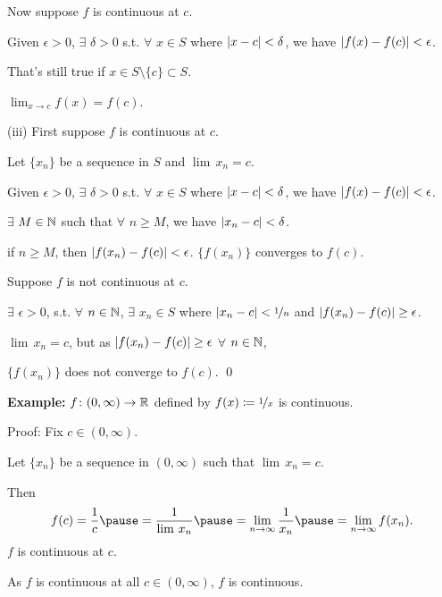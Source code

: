 \documentclass[10pt,aspectratio=169]{beamer}
\begin{document}
\begin{frame}
Now suppose $f$ is continuous at $c$.

\pause
Given $\epsilon > 0$, $\exists$ $\delta > 0$
s.t. $\forall$ $x \in S$ where $\left\lvert {x-c} \right\rvert < \delta$, we have
$\left\lvert {f(x)-f(c)} \right\rvert < \epsilon$.

\pause
That's still true if $x \in S \setminus \{ c \} \subset S$.

\pause
\thus \quad $\lim_{x\to c} f(x) = f(c)$.

\pause
\medskip

(iii)
First suppose $f$ is continuous at $c$.

\pause
Let $\{ x_n \}$ be a sequence in $S$ and $\lim\, x_n = c$.

\pause
Given $\epsilon > 0$, $\exists$ $\delta > 0$ s.t.
$\forall$ $x \in S$ where $\left\lvert {x-c} \right\rvert < \delta$, we have
$\left\lvert {f(x)-f(c)} \right\rvert < \epsilon$.

\pause
$\exists$ $M \in {\mathbb{N}}$
such that $\forall$ $n \geq M$, we have $\left\lvert {x_n-c} \right\rvert < \delta$.

\pause
\thus \quad if
$n \geq M$, then $\left\lvert {f(x_n)-f(c)} \right\rvert < \epsilon$.
\pause
\wthus $\bigl\{ f(x_n) \bigr\}$ converges to $f(c)$.

\pause
\medskip

Suppose $f$ is not continuous at $c$.

\pause
$\exists$ $\epsilon > 0$,
s.t. $\forall$ $n \in {\mathbb{N}}$,
$\exists$ $x_n \in S$
where
$\left\lvert {x_n-c} \right\rvert < \nicefrac{1}{n}$ and
$\left\lvert {f(x_n)-f(c)} \right\rvert \geq \epsilon$.

\pause
$\lim\, x_n = c$,
\quad
but as $\left\lvert {f(x_n)-f(c)} \right\rvert \geq \epsilon$ $\forall$ $n \in {\mathbb{N}}$,

\pause
\thus \quad $\{ f(x_n) \}$
does not converge to $f(c)$.
\qed

\end{frame}

\begin{frame}

\textbf{Example:}
$f \colon (0,\infty) \to {\mathbb{R}}$ defined by
$f(x) \coloneqq \nicefrac{1}{x}$ is continuous.

\pause
\medskip

Proof: Fix $c \in (0,\infty)$.  

\pause
Let $\{ x_n \}$ be a sequence in $(0,\infty)$ such that
$\lim\, x_n = c$.

\pause
Then
\[
f(c) = \frac{1}{c}
\pause
=
\frac{1}{\lim\, x_n}
\pause
=
\lim_{n \to \infty} \frac{1}{x_n}
\pause
=
\lim_{n \to \infty} f(x_n) .
\]
\pause
\thus \quad $f$ is continuous at $c$.

\pause
\medskip

As $f$ is continuous at all $c \in (0,\infty)$, $f$ is continuous.

\end{frame}
\end{document}
